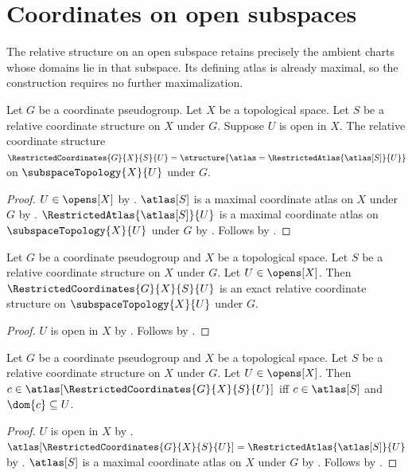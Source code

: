\section{Coordinates on open subspaces}




The relative structure on an open subspace retains precisely the ambient
charts whose domains lie in that subspace. Its defining atlas is already
maximal, so the construction requires no further maximalization.

\begin{construction}\label{restricted_coordinates}
    Let $G$ be a coordinate pseudogroup.
    Let $X$ be a topological space.
    Let $S$ be a relative coordinate structure on $X$ under $G$.
    Suppose $U$ is open in $X$.
    The relative coordinate structure $\RestrictedCoordinates{G}{X}{S}{U}=
        \structure{\atlas=\RestrictedAtlas{\atlas[S]}{U}}$
        on $\subspaceTopology{X}{U}$ under $G$.
\end{construction}
\begin{proof}
    $U\in\opens[X]$ by .
    $\atlas[S]$ is a maximal coordinate atlas on $X$ under $G$ by .
    $\RestrictedAtlas{\atlas[S]}{U}$ is a maximal coordinate atlas on $\subspaceTopology{X}{U}$ under $G$ by
        .
    Follows by .
\end{proof}

\begin{theorem}\label{restricted_coordinates_is_exact}
    Let $G$ be a coordinate pseudogroup and $X$ be a topological space.
    Let $S$ be a relative coordinate structure on $X$ under $G$.
    Let $U\in\opens[X]$.
    Then $\RestrictedCoordinates{G}{X}{S}{U}$ is an exact relative coordinate structure
        on $\subspaceTopology{X}{U}$ under $G$.
\end{theorem}
\begin{proof}
    $U$ is open in $X$ by .
    Follows by .
\end{proof}

\begin{theorem}\label{restricted_coordinates_chart_iff}
    Let $G$ be a coordinate pseudogroup and $X$ be a topological space.
    Let $S$ be a relative coordinate structure on $X$ under $G$.
    Let $U\in\opens[X]$.
    Then $c\in\atlas[\RestrictedCoordinates{G}{X}{S}{U}]$ iff
        $c\in\atlas[S]$ and $\dom{c}\subseteq U$.
\end{theorem}
\begin{proof}
    $U$ is open in $X$ by .
    $\atlas[\RestrictedCoordinates{G}{X}{S}{U}]=\RestrictedAtlas{\atlas[S]}{U}$ by
        .
    $\atlas[S]$ is a maximal coordinate atlas on $X$ under $G$ by .
    Follows by .
\end{proof}

